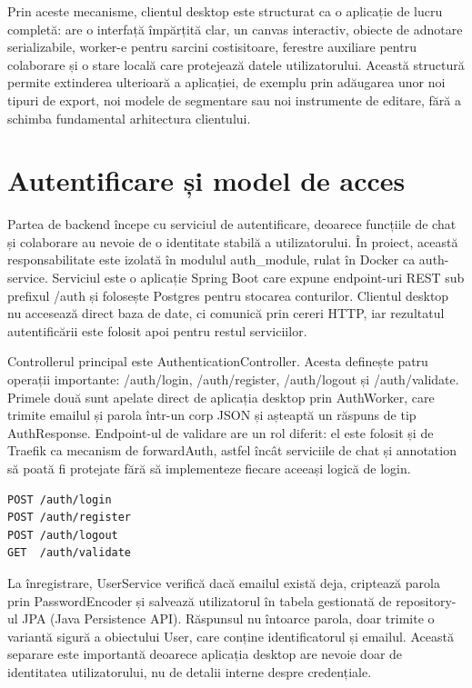 Prin aceste mecanisme, clientul desktop este structurat ca o aplicație de lucru completă: are o interfață împărțită clar, un canvas interactiv, obiecte de adnotare serializabile, worker-e pentru sarcini costisitoare, ferestre auxiliare pentru colaborare și o stare locală care protejează datele utilizatorului. Această structură permite extinderea ulterioară a aplicației, de exemplu prin adăugarea unor noi tipuri de export, noi modele de segmentare sau noi instrumente de editare, fără a schimba fundamental arhitectura clientului.

\section{Autentificare și model de acces}

Partea de backend începe cu serviciul de autentificare, deoarece funcțiile de chat și colaborare au nevoie de o identitate stabilă a utilizatorului. În proiect, această responsabilitate este izolată în modulul auth\_module, rulat în Docker ca auth-service. Serviciul este o aplicație Spring Boot care expune endpoint-uri REST sub prefixul /auth și folosește Postgres pentru stocarea conturilor. Clientul desktop nu accesează direct baza de date, ci comunică prin cereri HTTP, iar rezultatul autentificării este folosit apoi pentru restul serviciilor.

Controllerul principal este AuthenticationController. Acesta definește patru operații importante: /auth/login, /auth/register, /auth/logout și /auth/validate. Primele două sunt apelate direct de aplicația desktop prin AuthWorker, care trimite emailul și parola într-un corp JSON și așteaptă un răspuns de tip AuthResponse. Endpoint-ul de validare are un rol diferit: el este folosit și de Traefik ca mecanism de forwardAuth, astfel încât serviciile de chat și annotation să poată fi protejate fără să implementeze fiecare aceeași logică de login.

\begin{verbatim}
POST /auth/login
POST /auth/register
POST /auth/logout
GET  /auth/validate
\end{verbatim}

La înregistrare, UserService verifică dacă emailul există deja, criptează parola prin PasswordEncoder și salvează utilizatorul în tabela gestionată de repository-ul JPA (Java Persistence API). Răspunsul nu întoarce parola, doar trimite o variantă sigură a obiectului User, care conține identificatorul și emailul. Această separare este importantă deoarece aplicația desktop are nevoie doar de identitatea utilizatorului, nu de detalii interne despre credențiale.

